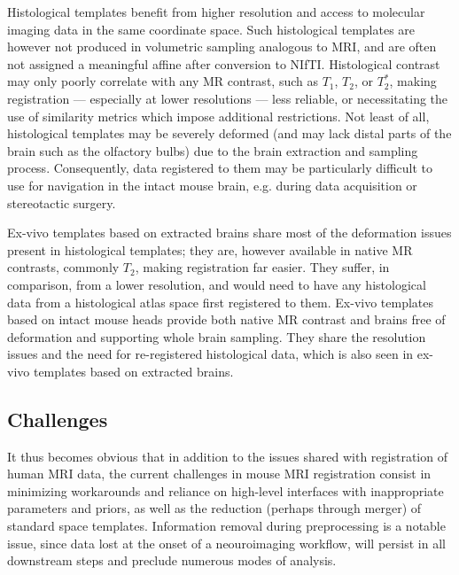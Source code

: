 Histological templates benefit from higher resolution and access to molecular imaging data in the same coordinate space.
Such histological templates are however not produced in volumetric sampling analogous to MRI, and are often not assigned a meaningful affine after conversion to NIfTI.
Histological contrast may only poorly correlate with any MR contrast, such as $T_1$, $T_2$, or $T_2^*$, making registration --- especially at lower resolutions --- less reliable, or necessitating the use of similarity metrics which impose additional restrictions.
Not least of all, histological templates may be severely deformed (and may lack distal parts of the brain such as the olfactory bulbs) due to the brain extraction and sampling process.
Consequently, data registered to them may be particularly difficult to use for navigation in the intact mouse brain, e.g. during data acquisition or stereotactic surgery.

Ex-vivo templates based on extracted brains share most of the deformation issues present in histological templates;
they are, however available in native MR contrasts, commonly $T_2$, making registration far easier.
They suffer, in comparison, from a lower resolution, and would need to have any histological data from a histological atlas space first registered to them.
Ex-vivo templates based on intact mouse heads provide both native MR contrast and brains free of deformation and supporting whole brain sampling.
They share the resolution issues and the need for re-registered histological data, which is also seen in ex-vivo templates based on extracted brains.

\subsection{Challenges}
It thus becomes obvious that in addition to the issues shared with registration of human MRI data, the current challenges in mouse MRI registration consist in minimizing workarounds and reliance on high-level interfaces with inappropriate parameters and priors, as well as the reduction (perhaps through merger) of standard space templates.
Information removal during preprocessing is a notable issue, since data lost at the onset of a neouroimaging workflow, will persist in all downstream steps and preclude numerous modes of analysis.

